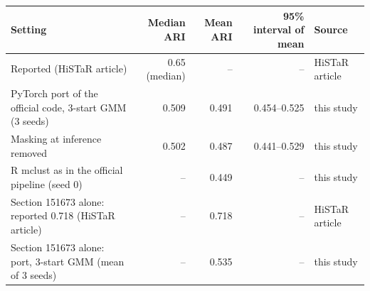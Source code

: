 \footnotesize
\begin{tabular}{lrrrl}
\toprule
Setting & Median ARI & Mean ARI & 95\% interval of mean & Source \\
\midrule
Reported (HiSTaR article) & 0.65 (median) & -- & -- & HiSTaR article \\
PyTorch port of the official code, 3-start GMM (3 seeds) & 0.509 & 0.491 & 0.454--0.525 & this study \\
Masking at inference removed & 0.502 & 0.487 & 0.441--0.529 & this study \\
R mclust as in the official pipeline (seed 0) & -- & 0.449 & -- & this study \\
Section 151673 alone: reported 0.718 (HiSTaR article) & -- & 0.718 & -- & HiSTaR article \\
Section 151673 alone: port, 3-start GMM (mean of 3 seeds) & -- & 0.535 & -- & this study \\
\bottomrule
\end{tabular}
